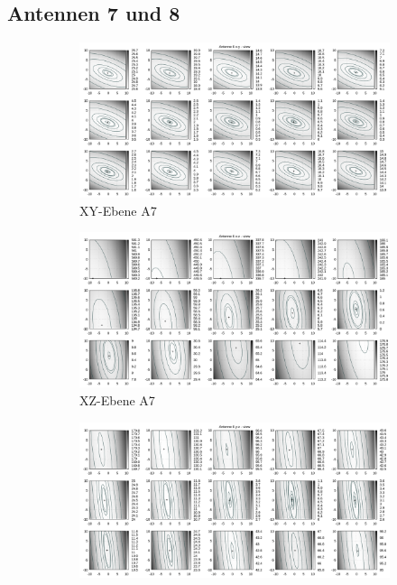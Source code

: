 \begin{appendix}
\begin{landscape}
\section{Antennen 7 und 8}
\begin{figure}[!ht]
	\centering
	\begin{subfigure}[t]{0.5\textwidth}
	     \centering
	     \includegraphics[width=\textwidth]{img/fitness/xy/a6.png}
	             \caption{XY-Ebene A7}
	\end{subfigure}
	\begin{subfigure}[t]{0.5\textwidth}
		\centering
	     \includegraphics[width=\textwidth]{img/fitness/xz/a6.png}
				\caption{XZ-Ebene A7}
	\end{subfigure}
	\begin{subfigure}[t]{0.5\textwidth}
			\centering
	   \includegraphics[width=\textwidth]{img/fitness/yz/a6.png}

\end{subfigure}
\end{figure}
\end{landscape}
\end{appendix}
